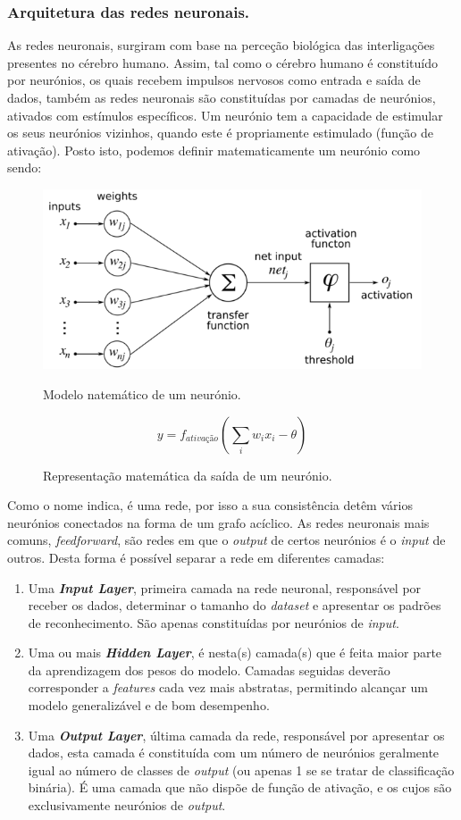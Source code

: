 \documentclass[]{article}
\begin{document}
\subsubsection{Arquitetura das redes neuronais.}
	As redes neuronais, surgiram com base na perceção biológica das interligações presentes no cérebro humano. Assim, tal como o cérebro humano é constituído por neurónios, os quais recebem impulsos nervosos como entrada e saída de dados, também as redes neuronais são constituídas por camadas de neurónios, ativados com estímulos específicos. Um neurónio tem a capacidade de estimular os seus neurónios vizinhos, quando este é propriamente estimulado (função de ativação). Posto isto, podemos definir matematicamente um neurónio como sendo:
    \begin{figure}[H]
    \centering
    \includegraphics[scale=.5]{img/neural.png}
    \caption{Modelo natemático de um neurónio.}
    
    \LARGE{\[ y = f_\textit{ativação} (\sum_{i} w_ix_i - \theta ) \]}
    \caption{Representação matemática da saída de um neurónio.}
    \end{figure}
    
    Como o nome indica, é uma rede, por isso a sua consistência detêm vários neurónios conectados na forma de um grafo acíclico. As redes neuronais mais comuns, \textit{feedforward}, são redes em que o \textit{output} de certos neurónios é o \textit{input} de outros.
Desta forma é possível separar a rede em diferentes camadas:
	\begin{enumerate}
		\item Uma \textbf{\textit{Input Layer}}, primeira camada na rede neuronal, responsável por receber os dados, determinar o tamanho do \textit{dataset} e apresentar os padrões de reconhecimento. São apenas constituídas por neurónios de \textit{input}.
		\item Uma ou mais \textbf{\textit{Hidden Layer}}, é nesta(s) camada(s) que é feita maior parte da aprendizagem dos pesos do modelo. Camadas seguidas deverão corresponder a \textit{features} cada vez mais abstratas, permitindo alcançar um modelo generalizável e de bom desempenho.
        \item Uma \textbf{\textit{Output Layer}}, última camada da rede, responsável por apresentar os dados, esta camada é constituída com um número de neurónios geralmente igual ao número de classes de \textit{output} (ou apenas 1 se se tratar de classificação binária). É uma camada que não dispõe de função de ativação, e os cujos são exclusivamente neurónios de \textit{output}.
	\end{enumerate}
    
\end{document}
